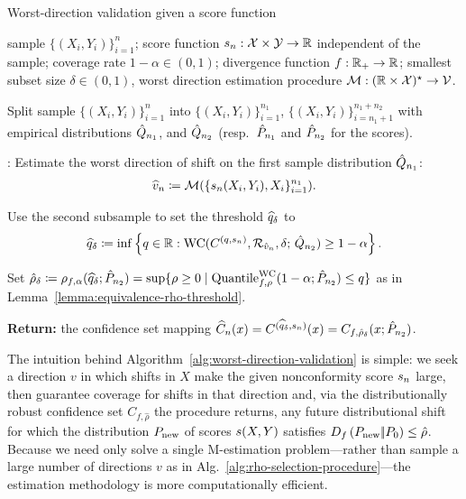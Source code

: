 \begin{algorithm}
  \caption{Worst-direction validation given a score function}
  \label{alg:worst-direction-validation}
  \begin{algorithmic}
     sample $\{(X_i,Y_i) \}_{i=1}^n$; score function
    $s_n: \mathcal{X} \times \mathcal{Y} \to \mathbb{R}$ independent of the sample;
    coverage rate $1-\alpha \in (0,1)$; divergence function $f : \mathbb{R}_+ \to
    \mathbb{R}$; smallest subset size $\delta \in (0,1)$, worst direction estimation procedure $\mathcal{M} :(\mathbb{R} \times \mathcal{X})^\star \to \mathcal{V}$.

     Split sample $\{ (X_i, Y_i) \}_{i=1}^n$ into
    $\{ (X_i,Y_i) \}_{i=1}^{n_1}$, $\{ (X_i,Y_i) \}_{i=n_1+1}^{n_1+n_2}$
    with empirical distributions $\hat{Q}_{n_1}$, and $\hat{Q}_{n_2}$
    (resp.\ $\hat{P}_{n_1}$ and $\hat{P}_{n_2}$ for the scores).
    
    : Estimate the worst direction of shift on the first sample distribution $\hat{Q}_{n_1}$:
    \begin{align*}
    \widehat{v}_n \coloneqq \mathcal{M}(\{ s_n(X_i, Y_i), X_i \}_{i=1}^{n_1}).
    \end{align*}

    \STATE Use the second subsample to set the threshold
    $\widehat{q}_\delta$ to
    \begin{align}
      \label{eqn:rhohat-criterion-worst-direction-after-learning-scores}
      \widehat{q}_\delta
      \coloneqq \inf \left\{ q \in \mathbb{R} : \textup{WC}(C^{(q,s_n)}, \mathcal{R}_{\hat{v}_n}, \delta; \, \hat{Q}_{n_2}) \geq 1-\alpha \right\}.
    \end{align}

    \STATE Set $\hat{\rho}_\delta \coloneqq \rho_{f,\alpha}( \widehat{q}_\delta;
    \hat{P}_{n_2}) = \sup\{\rho \ge 0 \mid
    \textup{Quantile}^{\textup{WC}}_{f,\rho}(1 - \alpha; \hat{P}_{n_2}) \le q\}$
    as in Lemma~\ref{lemma:equivalence-rho-threshold}.

    \STATE \textbf{Return:} the confidence set mapping $\widehat{C}_n(x)
    = C^{(\widehat{q}_\delta, s_n)}(x) = C_{f,\hat{\rho}_\delta}(x;
    \hat{P}_{n_2})$.
  \end{algorithmic}
\end{algorithm}

The intuition behind Algorithm~\ref{alg:worst-direction-validation} is
simple: we seek a direction $v$ in which shifts in $X$ make the given
nonconformity score $s_n$ large, then guarantee coverage for
shifts in that direction and, via the distributionally robust
confidence set $C_{f,\hat{\rho}}$ the procedure returns, any
future distributional shift for which the distribution
$P_{\textup{new}}$ of scores $s(X, Y)$ satisfies
$D_{f}\left({P_{\textup{new}}} |\!| {P_0}\right) \le \hat{\rho}$. Because we need only
solve a single M-estimation problem---rather than sample a large
number of directions $v$ as in Alg.~\ref{alg:rho-selection-procedure}---the estimation methodology is more computationally efficient.

